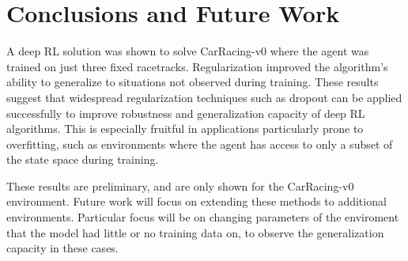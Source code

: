 \documentclass{article}
\begin{document}
\section{Conclusions and Future Work}
A deep RL solution was shown to solve CarRacing-v0 where the agent was
trained on just three fixed racetracks. 
Regularization improved the algorithm's ability to generalize to
situations not observed during training. These results suggest
that widespread regularization techniques such as dropout can be
applied successfully to improve robustness and generalization capacity
of deep RL algorithms. This is especially fruitful in applications
particularly prone to overfitting, such as environments where the
agent has access to only a subset of the state space during training.

These results are preliminary, and are only shown for the CarRacing-v0
environment. Future work will focus on extending these methods to
additional environments. Particular focus will be on changing
parameters of the enviroment that the model had little or no training
data on, to observe the generalization capacity in these cases.





\end{document}
